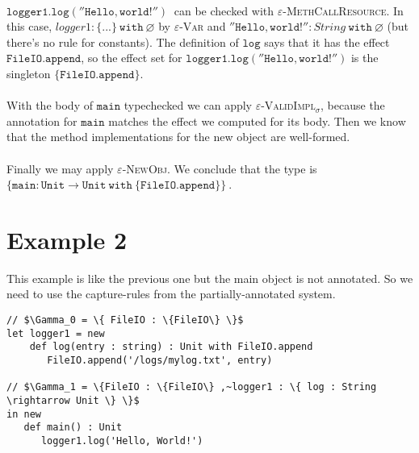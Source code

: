 \documentclass{llncs}
\newcommand{\keywadj}[1]{\mathtt{#1}}
\newcommand{\keyw}[1]{\keywadj{#1}~}
\begin{document}
\paragraph{}

$\keyw{logger1.log(''Hello, world!'')}$ can be checked with \textsc{$\varepsilon$-MethCallResource}. In this case, $logger1 : \{ ... \}~\keyw{with} \varnothing$ by \textsc{$\varepsilon$-Var} and $\keywadj{''Hello, world!''} : String~\keyw{with} \varnothing$ (but there's no rule for constants). The definition of $\keywadj{log}$ says that it has the effect $\keywadj{FileIO.append}$, so the effect set for $\keywadj{logger1.log(''Hello, world!'')}$ is the singleton
$\keywadj{\{FileIO.append\}}$.

\paragraph{}
With the body of $\keywadj{main}$ typechecked we can apply \textsc{$\varepsilon$-ValidImpl$_\sigma$}, because the annotation for $\keywadj{main}$ matches the effect we computed for its body. Then we know that the method implementations for the new object are well-formed.

\paragraph{}
Finally we may apply \textsc{$\varepsilon$-NewObj}. We conclude that the type is $\keyw{\{ main : Unit \rightarrow Unit~with~\{FileIO.append\} \}}$.


\section{Example 2}

This example is like the previous one but the main object is not annotated. So we need to use the capture-rules from the partially-annotated system.\\

\vspace{-6pt}
\begin{lstlisting}[xleftmargin=20pt]
// $\Gamma_0 = \{ FileIO : \{FileIO\} \}$
let logger1 = new
    def log(entry : string) : Unit with FileIO.append
       FileIO.append('/logs/mylog.txt', entry)
 
// $\Gamma_1 = \{FileIO : \{FileIO\} ,~logger1 : \{ log : String \rightarrow Unit \} \}$
in new
   def main() : Unit
      logger1.log('Hello, World!')
\end{lstlisting}
\end{document}
